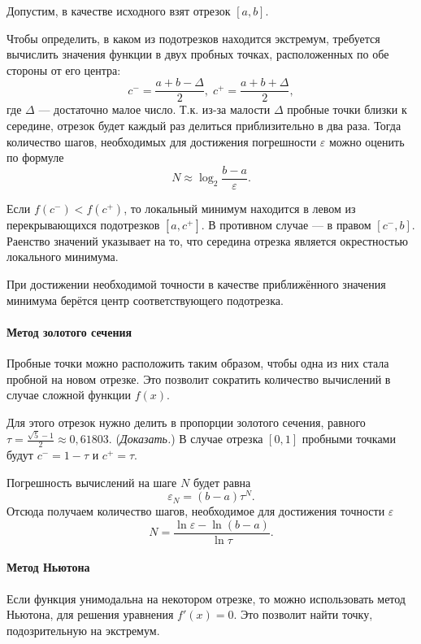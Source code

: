 Допустим, в качестве исходного взят отрезок $[a,b]$. 

Чтобы определить, в каком из подотрезков находится экстремум, требуется
вычислить значения функции в двух пробных точках, расположенных по
обе стороны от его центра:
\[
c^{-}=\frac{a+b-\Delta}{2},\; c^{+}=\frac{a+b+\Delta}{2},
\]
где $\Delta$ — достаточно малое число. Т.к. из-за малости $\Delta$
пробные точки близки к середине, отрезок будет каждый раз делиться
приблизительно в два раза. Тогда количество шагов, необходимых для
достижения погрешности $\varepsilon$ можно оценить по формуле
\[
N\approx\log_{2}\frac{b-a}{\varepsilon}.
\]


Если $f(c^{-})<f(c^{+})$, то локальный минимум находится в левом
из перекрывающихся подотрезков $[a,c^{+}]$. В противном случае —
в правом $[c^{-},b]$. Раенство значений указывает на то, что середина
отрезка является окрестностью локального минимума.

При достижении необходимой точности в качестве приближённого значения
минимума берётся центр соответствующего подотрезка.


\paragraph{Метод золотого сечения}

Пробные точки можно расположить таким образом, чтобы одна из них стала
пробной на новом отрезке. Это позволит сократить количество вычислений
в случае сложной функции $f(x).$

Для этого отрезок нужно делить в пропорции золотого сечения, равного
$\tau=\frac{\sqrt{5}-1}{2}\approx0{,}61803.$ (\emph{Доказать.}) В
случае отрезка $[0,1]$ пробными точками будут $c^{-}=1-\tau$ и $c^{+}=\tau$.

Погрешность вычислений на шаге $N$ будет равна
\[
\varepsilon_{N}=(b-a)\tau^{N}.
\]
Отсюда получаем количество шагов, необходимое для достижения точности
$\varepsilon$
\[
N=\frac{\ln\varepsilon-\ln(b-a)}{\ln\tau}.
\]



\paragraph{Метод Ньютона}

Если функция унимодальна на некотором отрезке, то можно использовать
метод Ньютона, для решения уравнения $f'(x)=0.$ Это позволит найти
точку, подозрительную на экстремум.



